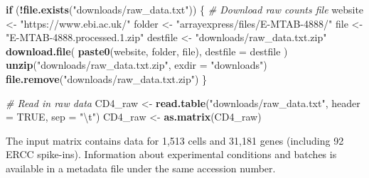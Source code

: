 \documentclass[9pt,a4paper,]{extarticle}
\newenvironment{Shaded}{\begin{snugshade}}{\end{snugshade}}
\newcommand{\CharTok}[1]{\textcolor[rgb]{0.31,0.60,0.02}{#1}}
\newcommand{\CommentTok}[1]{\textcolor[rgb]{0.56,0.35,0.01}{\textit{#1}}}
\newcommand{\ControlFlowTok}[1]{\textcolor[rgb]{0.13,0.29,0.53}{\textbf{#1}}}
\newcommand{\DataTypeTok}[1]{\textcolor[rgb]{0.13,0.29,0.53}{#1}}
\newcommand{\KeywordTok}[1]{\textcolor[rgb]{0.13,0.29,0.53}{\textbf{#1}}}
\newcommand{\NormalTok}[1]{#1}
\newcommand{\OperatorTok}[1]{\textcolor[rgb]{0.81,0.36,0.00}{\textbf{#1}}}
\newcommand{\OtherTok}[1]{\textcolor[rgb]{0.56,0.35,0.01}{#1}}
\newcommand{\StringTok}[1]{\textcolor[rgb]{0.31,0.60,0.02}{#1}}
\begin{document}
\begin{Shaded}
\begin{Highlighting}[]
\ControlFlowTok{if}\NormalTok{ (}\OperatorTok{!}\KeywordTok{file.exists}\NormalTok{(}\StringTok{"downloads/raw_data.txt"}\NormalTok{)) \{}
  \CommentTok{# Download raw counts file}
\NormalTok{  website <-}\StringTok{ "https://www.ebi.ac.uk/"}
\NormalTok{  folder <-}\StringTok{ "arrayexpress/files/E-MTAB-4888/"}
\NormalTok{  file <-}\StringTok{ "E-MTAB-4888.processed.1.zip"}
\NormalTok{  destfile <-}\StringTok{ "downloads/raw_data.txt.zip"}
  \KeywordTok{download.file}\NormalTok{(}
    \KeywordTok{paste0}\NormalTok{(website, folder, file),}
    \DataTypeTok{destfile =}\NormalTok{ destfile}
\NormalTok{  )}
  \KeywordTok{unzip}\NormalTok{(}\StringTok{"downloads/raw_data.txt.zip"}\NormalTok{, }\DataTypeTok{exdir =} \StringTok{"downloads"}\NormalTok{)}
  \KeywordTok{file.remove}\NormalTok{(}\StringTok{"downloads/raw_data.txt.zip"}\NormalTok{)}
\NormalTok{\}}

\CommentTok{# Read in raw data}
\NormalTok{CD4_raw <-}\StringTok{ }\KeywordTok{read.table}\NormalTok{(}\StringTok{"downloads/raw_data.txt"}\NormalTok{, }\DataTypeTok{header =} \OtherTok{TRUE}\NormalTok{, }\DataTypeTok{sep =} \StringTok{"}\CharTok{\textbackslash{}t}\StringTok{"}\NormalTok{)}
\NormalTok{CD4_raw <-}\StringTok{ }\KeywordTok{as.matrix}\NormalTok{(CD4_raw)}
\end{Highlighting}
\end{Shaded}

The input matrix contains data for 1,513
cells and 31,181
genes (including 92 ERCC spike-ins).
Information about experimental conditions and batches is available in a metadata
file under the same accession number.
\end{document}
